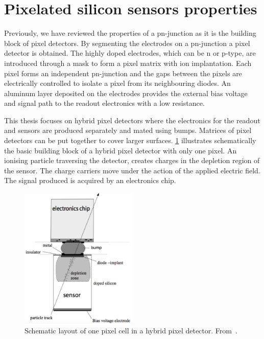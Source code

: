 
\section{Pixelated silicon sensors properties}

Previously, we have reviewed the properties of a pn-junction as it is
the building block of pixel detectors. By segmenting the electrodes on
a pn-junction a pixel detector is obtained. The highly doped
electrodes, which can be n or p-type, are introduced through a mask to
form a pixel matrix with ion implantation. Each pixel forms an
independent pn-junction and the gaps between the pixels are
electrically controlled to isolate a pixel from its neighbouring
diodes. An aluminum layer deposited on the electrodes provides the
external bias voltage and signal path to the readout electronics with
a low resistance. 

This thesis focuses on hybrid pixel detectors where the electronics
for the readout and sensors are produced separately and mated using
bumps. Matrices of pixel detectors can be put together to cover larger
surfaces. \cref{fig:pixelCell} illustrates schematically the basic
building block of a hybrid pixel detector with only one pixel. An
ionising particle traversing the detector, creates charges in the
depletion region of the sensor. The charge carriers move under the
action of the applied electric field. The signal produced is acquired
by an electronics chip.

\begin{figure}[htbp]
  \centering
  \includegraphics[width=0.5\textwidth]{figures/ChargeSharing/PixelCell.png}
  \caption{Schematic layout of one pixel cell in a hybrid pixel
    detector. From~\cite{Rossi:976471}.}
  \label{fig:pixelCell}
\end{figure}

